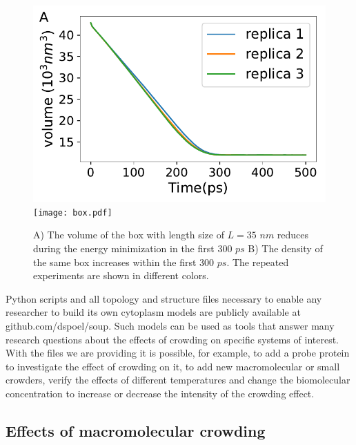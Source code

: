 \documentclass[journal=jacsat,manuscript=article]{achemso}
\begin{document}
\begin{figure}[H]
\includegraphics[scale=0.5]{shrinking_volume.pdf} 
\texttt{[image: box.pdf]} 

\caption{A) The volume of the box with length size of $L=35 \,\, nm$ reduces during the energy minimization in the first $300 \,\, ps$ B) The density of the same box increases within the first $300\,\, ps$. The repeated experiments are shown in different colors. }
\end{figure}



Python scripts and all topology and structure files necessary to enable any researcher to build its own cytoplasm models are publicly available at github.com/dspoel/soup. Such models can be used as tools that answer many research questions about the effects of crowding on specific systems of interest. With the files we are providing it is possible, for example, to add a probe protein to investigate the effect of crowding on it, to add new macromolecular or small crowders, verify the effects of different temperatures and change the biomolecular concentration to increase or decrease the intensity of the crowding effect.











\subsection{Effects of macromolecular crowding}
\end{document}
